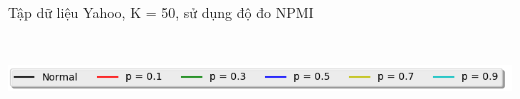 \documentclass[pdf]{beamer}
\begin{document}
\begin{frame}{Tập dữ liệu Yahoo, K = 50, sử dụng độ đo NPMI }
\begin{columns}[T] %
\begin{column}{.50\textwidth}
\begin{figure}
\end{figure}
\end{column} %
\hfill%
\begin{column}{.50\textwidth}
\begin{figure}
\end{figure}				
\end{column} %
\end{columns}
\begin{center}
\includegraphics[width=1\textwidth]{menu.png}	
\end{center}
\end{frame}
\end{document}
